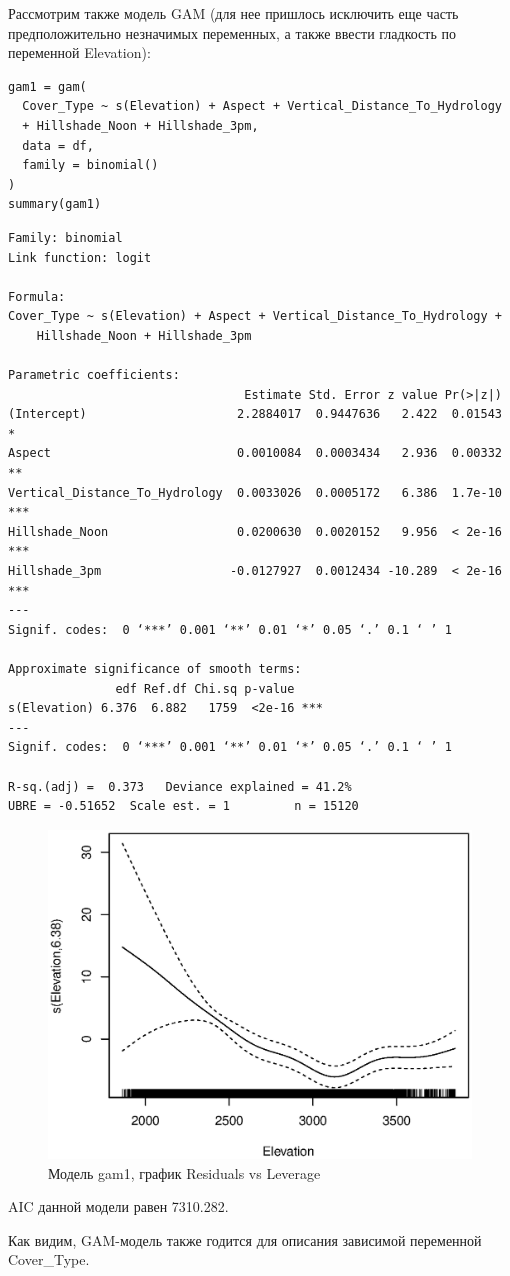 \documentclass[12pt]{article}
\begin{document}
Рассмотрим также модель GAM (для нее пришлось исключить еще часть предположительно незначимых переменных, а также ввести гладкость
по переменной Elevation):
\begin{lstlisting}
gam1 = gam(
  Cover_Type ~ s(Elevation) + Aspect + Vertical_Distance_To_Hydrology
  + Hillshade_Noon + Hillshade_3pm,
  data = df,
  family = binomial()
)
summary(gam1)
\end{lstlisting}
\begin{lstlisting}
Family: binomial 
Link function: logit 

Formula:
Cover_Type ~ s(Elevation) + Aspect + Vertical_Distance_To_Hydrology + 
    Hillshade_Noon + Hillshade_3pm

Parametric coefficients:
                                 Estimate Std. Error z value Pr(>|z|)    
(Intercept)                     2.2884017  0.9447636   2.422  0.01543 *  
Aspect                          0.0010084  0.0003434   2.936  0.00332 ** 
Vertical_Distance_To_Hydrology  0.0033026  0.0005172   6.386  1.7e-10 ***
Hillshade_Noon                  0.0200630  0.0020152   9.956  < 2e-16 ***
Hillshade_3pm                  -0.0127927  0.0012434 -10.289  < 2e-16 ***
---
Signif. codes:  0 ‘***’ 0.001 ‘**’ 0.01 ‘*’ 0.05 ‘.’ 0.1 ‘ ’ 1

Approximate significance of smooth terms:
               edf Ref.df Chi.sq p-value    
s(Elevation) 6.376  6.882   1759  <2e-16 ***
---
Signif. codes:  0 ‘***’ 0.001 ‘**’ 0.01 ‘*’ 0.05 ‘.’ 0.1 ‘ ’ 1

R-sq.(adj) =  0.373   Deviance explained = 41.2%
UBRE = -0.51652  Scale est. = 1         n = 15120
\end{lstlisting}
\begin{figure}[H]
\centering
\includegraphics[width=0.9\linewidth]{gam1}
\caption{Модель gam1, график Residuals vs Leverage}
\label{fig:gam1}
\end{figure}
AIC данной модели равен 7310.282.

Как видим, GAM-модель также годится для описания зависимой переменной Cover\_Type.
\end{document}
